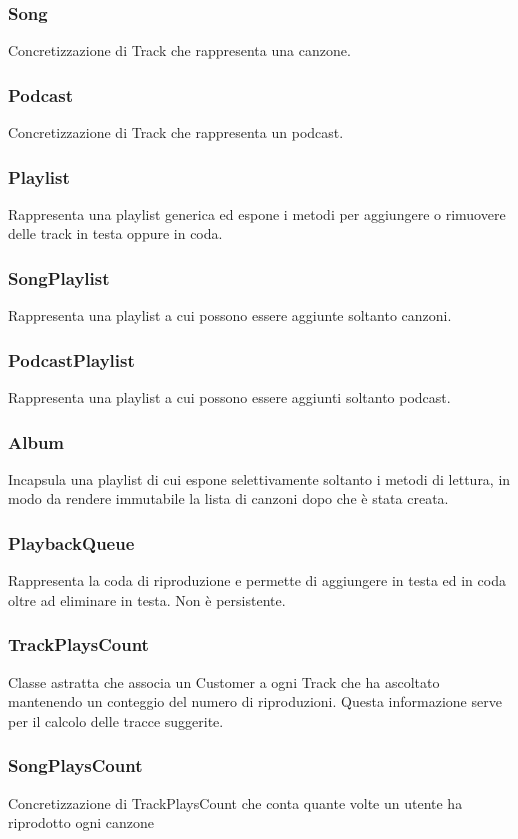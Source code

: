 \documentclass{article}
\begin{document}
  \subsubsection{Song}
  Concretizzazione di Track che rappresenta una canzone.
  \subsubsection{Podcast}
  Concretizzazione di Track che rappresenta un podcast.
  \subsubsection{Playlist}
  Rappresenta una playlist generica ed espone i metodi per aggiungere o rimuovere\\ delle track in testa oppure in coda.

  \subsubsection{SongPlaylist}
  Rappresenta una playlist a cui possono essere aggiunte soltanto canzoni.

  \subsubsection{PodcastPlaylist}
  Rappresenta una playlist a cui possono essere aggiunti soltanto podcast.
  \subsubsection{Album}
  Incapsula una playlist di cui espone selettivamente soltanto i metodi di lettura, in modo da rendere immutabile la lista di canzoni dopo che è stata creata.
  \subsubsection{PlaybackQueue}
  Rappresenta la coda di riproduzione e permette di aggiungere in testa ed in coda oltre ad eliminare in testa. Non è persistente.

  \subsubsection{TrackPlaysCount}
  Classe astratta che associa un Customer a ogni Track che ha ascoltato mantenendo un conteggio del numero di riproduzioni. Questa informazione serve per il calcolo delle tracce suggerite.

  \subsubsection{SongPlaysCount}
  Concretizzazione di TrackPlaysCount che conta quante volte un utente ha riprodotto ogni canzone
\end{document}
